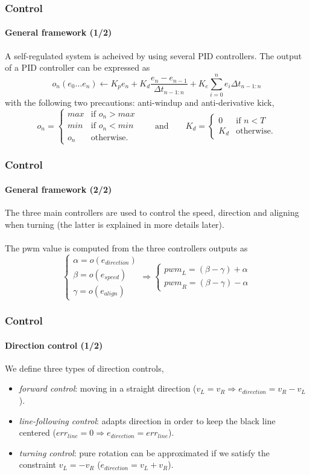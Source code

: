 \documentclass[10pt]{beamer}
\begin{document}
\begin{frame}
\frametitle{Control}
\framesubtitle{General framework (1/2)}
A self-regulated system is acheived by using several PID controllers. The output of a PID controller can be expressed as
$$ 
o_n (e_0...e_n) \leftarrow K_p e_n + K_d\frac{e_n - e_{n-1}}{\Delta t_{n-1:n}} + K_e\sum_{i=0}^{n}{e_i \Delta t_{n-1:n}}
$$
with the following two precautions: anti-windup and anti-derivative kick,
$$
o_n = \left\{
    \begin{array}{ll}
        max & \mbox{if } o_n > max \\
        min & \mbox{if } o_n < min \\
        o_n & \mbox{otherwise.}
    \end{array}
\right.
\qquad\text{and}\qquad	
K_d = \left\{
    \begin{array}{ll}
        0 & \mbox{if } n < T \\
       K_d & \mbox{otherwise.}
    \end{array}
\right.
$$
\end{frame}


\begin{frame}
\frametitle{Control}
\framesubtitle{General framework (2/2)}
The three main controllers are used to control the speed, direction and aligning when turning (the latter is explained in more details later).\\~\\
The pwm value is computed from the three controllers outputs as
$$ 
\left\{
    \begin{array}{ll}
		\alpha = o(e_{direction}) \\[0.3cm]
		\beta = o(e_{speed}) \\[0.3cm]
		\gamma = o(e_{align})
	\end{array}
\right.
\Rightarrow
\left\{
    \begin{array}{ll}
		{pwm}_L =  (\beta -\gamma) + \alpha \\
		{pwm}_R = (\beta - \gamma) - \alpha
	\end{array}
\right.
$$
\end{frame}


\begin{frame}
\frametitle{Control}
\framesubtitle{Direction control (1/2)}
We define three types of direction controls,
\begin{itemize}
\item \textit{forward control}: moving in a straight direction ($v_L = v_R \Rightarrow e_{direction} = v_R - v_L$).
\item \textit{line-following control}: adapts direction in order to keep the black line centered ($err_{line} = 0 \Rightarrow e_{direction} = err_{line}$).
\item \textit{turning control}: pure rotation can be approximated if we satisfy the constraint  $v_L = -v_R$ ($e_{direction} = v_L + v_R$).
\end{itemize}
\end{frame}
\end{document}
